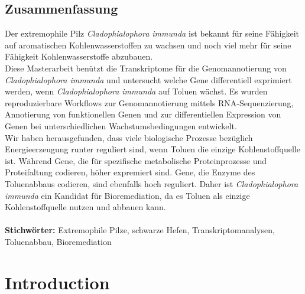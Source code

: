 \documentclass[12pt, a4paper]{report}
\begin{document}
\section*{Zusammenfassung}
Der extremophile Pilz \textit{Cladophialophora immunda} ist bekannt für seine Fähigkeit auf aromatischen Kohlenwasserstoffen zu wachsen und noch viel mehr für seine Fähigkeit Kohlenwasserstoffe abzubauen. \\
Diese Masterarbeit benützt die Transkriptome für die Genomannotierung von \textit{Cladophialophora immunda} und untersucht welche Gene differentiell exprimiert werden, wenn \textit{Cladophialophora immunda} auf Toluen wächst. Es wurden reproduzierbare Workflows zur Genomannotierung mittels RNA-Sequenzierung, Annotierung von funktionellen Genen und zur differentiellen Expression von Genen bei unterschiedlichen Wachstumsbedingungen entwickelt. \\
Wir haben herausgefunden, dass viele biologische Prozesse bezüglich Energieerzeugung runter reguliert sind, wenn Toluen die einzige Kohlenstoffquelle ist. Während Gene, die für spezifische metabolische Proteinprozesse und Proteifaltung codieren, höher expremiert sind. Gene, die Enzyme des Toluenabbaus codieren, sind ebenfalls hoch reguliert. Daher ist \textit{Cladophialophora immunda} ein Kandidat für Bioremediation, da es Toluen als einzige Kohlenstoffquelle nutzen und abbauen kann.\\
\ \\
\textbf{Stichw\"orter:} Extremophile Pilze, schwarze Hefen, Transkriptomanalysen, Toluenabbau, Bioremediation
\newpage
\tableofcontents
\newpage
\setcounter{chapter}{1}
\setcounter{figure}{0}

\chapter*{Introduction} 
\end{document}
